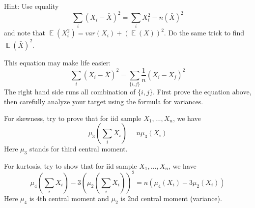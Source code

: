 \documentclass[paper=a4, fontsize=11pt]{scrartcl} %
\newenvironment{exercise}[2][Exercise]{\begin{trivlist}
\item[\hskip \labelsep {\bfseries #1}\hskip \labelsep {\bfseries #2.}]}{\end{trivlist}}
\numberwithin{equation}{section} %
\numberwithin{figure}{section} %
\numberwithin{table}{section} %
\newcommand{\E}{\operatorname{\mathbb{E}}}
\begin{document}
Hint: Use equality
$$
\sum_i (X_i - \bar{X})^2 = \sum_i X_i^2 - n(\bar{X})^2
$$
and note that $\E (X^2_i) = var (X_i) + (\E(X))^2$. Do the same trick to find $\E(\bar{X})^2$.

\begin{exercise}{class.2} 
\end{exercise}

This equation may make life easier:
$$
\sum_i (X_i - \bar{X})^2 = \sum_{\{i,j\}} \frac{1}{n} (X_i - X_j)^2
$$
The right hand side runs all combination of $\{i,j\}$. First prove the equation above, then carefully analyze your target using the formula for variances.

\begin{exercise}{class.3} 
\end{exercise}

For skewness, try to prove that for iid sample $X_1,\ldots , X_n$, we have
$$
\mu_3 (\sum_i X_i) = n \mu_3(X_i)
$$
Here $\mu_3$ stands for third central moment.

For kurtosis, try to show that for iid sample $X_1,\ldots , X_n$, we have
$$
\mu_4 (\sum_i X_i) - 3(\mu_2(\sum_i X_i))^2 = n (\mu_4(X_i) - 3\mu_2(X_i))
$$
Here $\mu_4$ is 4th central moment and $\mu_2$ is 2nd central moment (variance).
\end{document}
